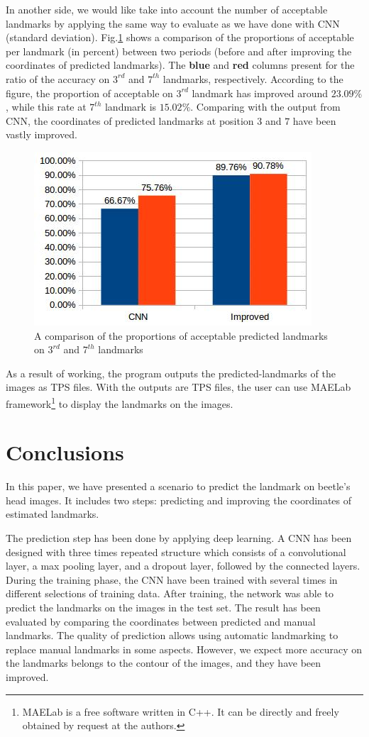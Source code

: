 \documentclass[10pt]{article}
\begin{document}
In another side, we would like take into account the number of acceptable landmarks by applying the same way to evaluate as we have done with CNN (standard deviation). Fig.\ref{figchart2} shows a comparison of the proportions of acceptable per landmark (in percent) between two periods (before and after improving the coordinates of predicted landmarks). The \textbf{blue} and \textbf{red} columns present for the ratio of the accuracy on $3^{rd}$ and $7^{th}$ landmarks, respectively. According to the figure, the proportion of acceptable on $3^{rd}$ landmark has improved around $23.09\%$, while this rate at $7^{th}$ landmark is $15.02\%$. Comparing with the output from CNN, the coordinates of predicted landmarks at position $3$ and $7$ have been vastly improved.

\begin{figure}[htbp]
	\centerline{\includegraphics[scale=0.9]{images/improving}}
	\caption{A comparison of the proportions of acceptable predicted landmarks on $3^{rd}$ and $7^{th}$ landmarks}
	\label{figchart2}
\end{figure}

As a result of working, the program outputs the
predicted-landmarks of the images as TPS files. With the outputs are TPS files,
the user can use MAELab framework\footnote{MAELab is a free software written in C++. It can be directly and freely
obtained by request at the authors.} to display the
landmarks on the images.
\section{Conclusions}
In this paper, we have presented a scenario to predict the landmark on beetle's head images. It includes two steps: predicting and improving the coordinates of estimated landmarks. 

The prediction step has been done by applying deep learning. A CNN has been designed with three times repeated structure which consists of a convolutional layer, a max pooling layer, and a dropout layer, followed by the connected layers. During the training phase, the CNN have been trained with several times in different selections of training data. After training, the network was able to predict the landmarks on the images in the test set. The result has been evaluated by comparing the coordinates between predicted and manual landmarks. The quality of prediction allows using automatic
landmarking to replace manual landmarks in some aspects. However, we expect more accuracy on the landmarks belongs to the contour of the images, and they have been improved.
\end{document}
